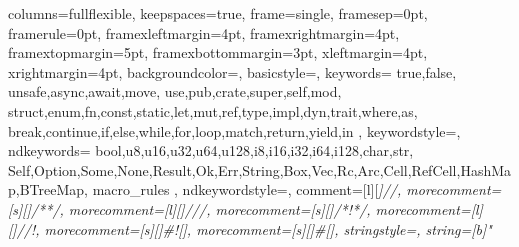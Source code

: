 
\usepackage{color}
\usepackage{listings}
{
    columns=fullflexible,
    keepspaces=true,
    frame=single,
    framesep=0pt,
    framerule=0pt,
    framexleftmargin=4pt,
    framexrightmargin=4pt,
    framextopmargin=5pt,
    framexbottommargin=3pt,
    xleftmargin=4pt,
    xrightmargin=4pt,
    backgroundcolor=\color{GrayCodeBlock},
    basicstyle=\ttfamily\color{BlackText},
    keywords={
        true,false,
        unsafe,async,await,move,
        use,pub,crate,super,self,mod,
        struct,enum,fn,const,static,let,mut,ref,type,impl,dyn,trait,where,as,
        break,continue,if,else,while,for,loop,match,return,yield,in
    },
    keywordstyle=\color{PurpleKeyword},
    ndkeywords={
        bool,u8,u16,u32,u64,u128,i8,i16,i32,i64,i128,char,str,
        Self,Option,Some,None,Result,Ok,Err,String,Box,Vec,Rc,Arc,Cell,RefCell,HashMap,BTreeMap,
        macro_rules
    },
    ndkeywordstyle=\color{RedTypename},
    comment=[l][\color{GrayComment}\slshape]{//},
    morecomment=[s][\color{GrayComment}\slshape]{/*}{*/},
    morecomment=[l][\color{GoldDocumentation}\slshape]{///},
    morecomment=[s][\color{GoldDocumentation}\slshape]{/*!}{*/},
    morecomment=[l][\color{GoldDocumentation}\slshape]{//!},
    morecomment=[s][\color{RedTypename}]{\#![}{]},
    morecomment=[s][\color{RedTypename}]{\#[}{]},
    stringstyle=\color{GreenString},
    string=[b]"
}


